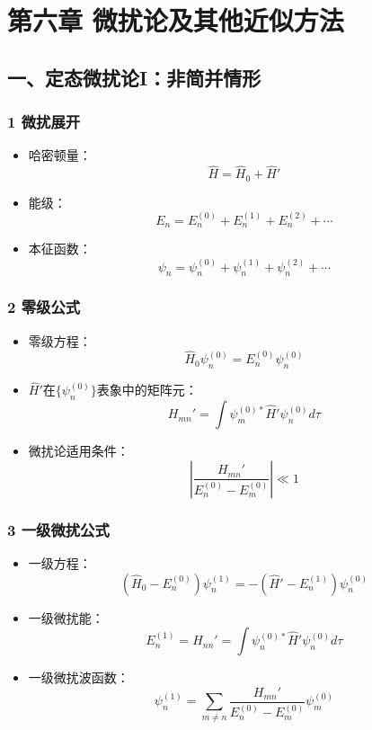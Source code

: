 \documentclass[UTF8,twocolumn]{ctexart}
\date{}
\providecommand{\tightlist}{%
  \setlength{\itemsep}{0pt}\setlength{\parskip}{0pt}}
\begin{document}
\section{第六章{ }微扰论及其他近似方法}\label{ux7b2cux516dux7ae0-ux5faeux6270ux8bbaux53caux5176ux4ed6ux8fd1ux4f3cux65b9ux6cd5}

\subsection{一、定态微扰论I：非简并情形}\label{ux4e00ux5b9aux6001ux5faeux6270ux8bbaiux975eux7b80ux5e76ux60c5ux5f62}

\subsubsection{1 微扰展开}\label{ux5faeux6270ux5c55ux5f00}

\begin{itemize}
\tightlist
\item
  哈密顿量： \[\hat{H}=\hat{H}_0+\hat{H}'\]
\item
  能级： \[E_n=E_n^{(0)}+E_n^{(1)}+E_n^{(2)}+\cdots\]
\item
  本征函数： \[\psi_n=\psi_n^{(0)}+\psi_n^{(1)}+\psi_n^{(2)}+\cdots\]
\end{itemize}

\subsubsection{2 零级公式}\label{ux96f6ux7ea7ux516cux5f0f}

\begin{itemize}
\tightlist
\item
  零级方程： \[\hat{H}_0\psi_n^{(0)}=E_n^{(0)}\psi_n^{(0)}\]
\item
  \(\hat{H}'\)在\(\{\psi_n^{(0)}\}\)表象中的矩阵元：
  \[H_{mn}'=\int\psi_m^{(0)*}\hat{H}'\psi_n^{(0)}d\tau\]
\item
  微扰论适用条件： \[|\frac{H_{mn}'}{E_n^{(0)}-E_m^{(0)}}|\ll1\]
\end{itemize}

\subsubsection{3
一级微扰公式}\label{ux4e00ux7ea7ux5faeux6270ux516cux5f0f}

\begin{itemize}
\tightlist
\item
  一级方程：
  \[(\hat{H}_0-E_n^{(0)})\psi_n^{(1)}=-(\hat{H}'-E_n^{(1)})\psi_n^{(0)}\]
\item
  一级微扰能：
  \[E_n^{(1)}=H_{nn}'=\int\psi_n^{(0)*}\hat{H}'\psi_n^{(0)}d\tau\]
\item
  一级微扰波函数：
  \[\psi_n^{(1)}=\sum_{m\neq n}\frac{H_{mn}'}{E_n^{(0)}-E_m^{(0)}}\psi_m^{(0)}\]
\end{itemize}
\end{document}
